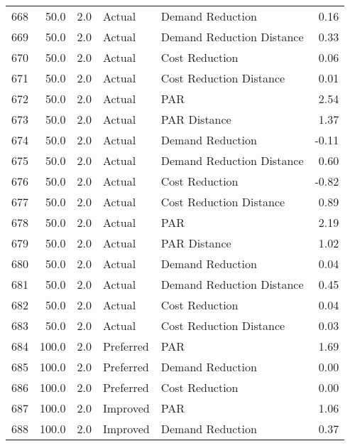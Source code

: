 \begin{longtable}{lrrllr}
668  &         50.0 &     2.0 &         Actual &           Demand Reduction &   0.16 \\
669  &         50.0 &     2.0 &         Actual &  Demand Reduction Distance &   0.33 \\
670  &         50.0 &     2.0 &         Actual &             Cost Reduction &   0.06 \\
671  &         50.0 &     2.0 &         Actual &    Cost Reduction Distance &   0.01 \\
672  &         50.0 &     2.0 &         Actual &                        PAR &   2.54 \\
673  &         50.0 &     2.0 &         Actual &               PAR Distance &   1.37 \\
674  &         50.0 &     2.0 &         Actual &           Demand Reduction &  -0.11 \\
675  &         50.0 &     2.0 &         Actual &  Demand Reduction Distance &   0.60 \\
676  &         50.0 &     2.0 &         Actual &             Cost Reduction &  -0.82 \\
677  &         50.0 &     2.0 &         Actual &    Cost Reduction Distance &   0.89 \\
678  &         50.0 &     2.0 &         Actual &                        PAR &   2.19 \\
679  &         50.0 &     2.0 &         Actual &               PAR Distance &   1.02 \\
680  &         50.0 &     2.0 &         Actual &           Demand Reduction &   0.04 \\
681  &         50.0 &     2.0 &         Actual &  Demand Reduction Distance &   0.45 \\
682  &         50.0 &     2.0 &         Actual &             Cost Reduction &   0.04 \\
683  &         50.0 &     2.0 &         Actual &    Cost Reduction Distance &   0.03 \\
684  &        100.0 &     2.0 &      Preferred &                        PAR &   1.69 \\
685  &        100.0 &     2.0 &      Preferred &           Demand Reduction &   0.00 \\
686  &        100.0 &     2.0 &      Preferred &             Cost Reduction &   0.00 \\
687  &        100.0 &     2.0 &       Improved &                        PAR &   1.06 \\
688  &        100.0 &     2.0 &       Improved &           Demand Reduction &   0.37 \\

\end{longtable}
